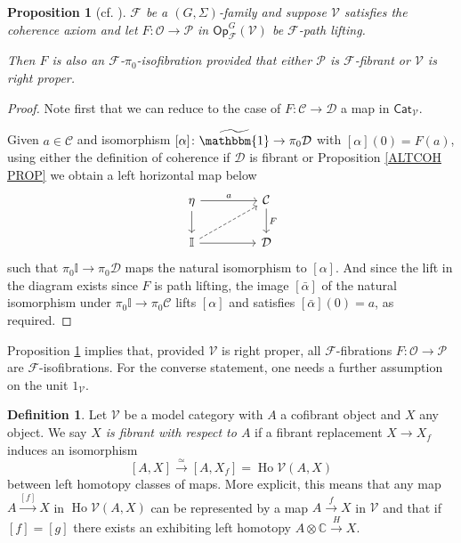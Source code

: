 \documentclass[a4paper,10pt
,draft
]{article}%
\numberwithin{equation}{section}
\numberwithin{figure}{section}
\newtheorem{proposition}[equation]{Proposition}%
\theoremstyle{definition} %
\newtheorem{definition}[equation]{Definition}%
\newcommand{\Op}{\mathsf{Op}}%
\DeclareMathOperator{\Ho}{Ho}
\newcommand{\F}{\ensuremath{\mathcal F}}
\newcommand{\V}{\ensuremath{\mathcal V}}
\renewcommand{\O}{\ensuremath{\mathcal O}}
\renewcommand{\P}{\ensuremath{\mathcal P}}
\newcommand{\1}{\ensuremath{\mathbbm 1}}%
\begin{document}
\begin{proposition}[{cf. \cite[Props. 2.3]{Ber07b}}]
      \label{ISOFIBEASY PROP}
$\F$ be a $(G,\Sigma)$-family and 
suppose $\V$ satisfies the coherence axiom
and let 
$F: \O \to \P$ in $\Op^G_\F(\V)$
be $\F$-path lifting.

Then $F$ is also an $\F$-$\pi_0$-isofibration
provided that either $\mathcal{P}$ is $\F$-fibrant
or $\V$ is right proper.
\end{proposition}


\begin{proof}
Note first that we can reduce to 
the case of $F \colon \mathcal{C} \to \mathcal{D}$
a map in $\mathsf{Cat}_{\V}$.

Given $a \in \mathcal{C}$
and isomorphism $[\alpha] \colon \widetilde{\mathbbm{1}} \to \pi_0 \mathcal{D}$
with $[\alpha](0)=F(a)$,
using either the definition of coherence 
if $\mathcal{D}$ is fibrant or 
Proposition \ref{ALTCOH PROP}
we obtain a left horizontal map below 
\begin{equation}
\begin{tikzcd}[column sep = 45pt]
	\eta \ar{d} \ar{r}{a}
&
	\mathcal{C} \ar{d}{F}
\\
	\mathbb{I} \ar{r} \ar[dashed]{ru}
&
	\mathcal{D}
\end{tikzcd}
\end{equation}
such that $\pi_0 \mathbb{I} \to \pi_0\mathcal{D}$
maps the natural isomorphism to $[\alpha]$.
And since the lift in the diagram exists since $F$ is path lifting,
the image $[\bar{\alpha}]$
of the natural isomorphism
under $\pi_0 \mathbb{I} \to \pi_0\mathcal{C}$
lifts $[\alpha]$
and satisfies $[\bar{\alpha}](0) = a$, as required.
\end{proof}



Proposition \ref{ISOFIBEASY PROP}
implies that, provided $\V$ is right proper,
all $\F$-fibrations $F \colon \mathcal{O} \to \mathcal{P}$ are $\F$-isofibrations.
%
For the converse statement, 
one needs a further assumption on 
the unit $1_{\V}$.


\begin{definition}
Let $\V$ be a model category with $A$ a cofibrant object and 
$X$ any object.
We say \emph{$X$ is fibrant with respect to $A$}
if a fibrant replacement $X\to X_f$
induces an isomorphism
\[
[A,X] \xrightarrow{\simeq} [A,X_f] = \Ho \V (A,X)
\]
between left homotopy classes of maps.
More explicit, this means that any 
map $A \xrightarrow{[f]} X$ in $\Ho \V (A,X)$
can be represented by a map 
$A \xrightarrow{f} X$ in $\V$
and that if $[f]=[g]$ there exists an exhibiting left homotopy
$A \otimes \mathbb{C} \xrightarrow{H} X$. 
\end{definition}
\end{document}
